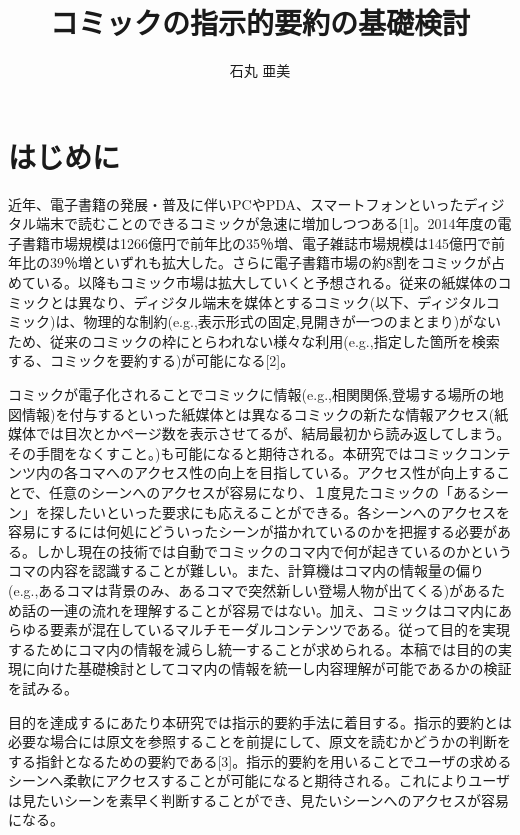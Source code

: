 \documentclass[a4j]{matsushita-zemi}
\title{コミックの指示的要約の基礎検討}
\author{石丸 亜美}
\begin{document}
\maketitle

\section{はじめに}
\label{background} 

近年、電子書籍の発展・普及に伴いPCやPDA、スマートフォンといったディジタル端末で読むことのできるコミックが急速に増加しつつある[1]。2014年度の電子書籍市場規模は1266億円で前年比の35％増、電子雑誌市場規模は145億円で前年比の39％増といずれも拡大した。さらに電子書籍市場の約8割をコミックが占めている。以降もコミック市場は拡大していくと予想される。従来の紙媒体のコミックとは異なり、ディジタル端末を媒体とするコミック(以下、ディジタルコミック)は、物理的な制約(e.g.,表示形式の固定,見開きが一つのまとまり)がないため、従来のコミックの枠にとらわれない様々な利用(e.g.,指定した箇所を検索する、コミックを要約する)が可能になる[2]。

コミックが電子化されることでコミックに情報(e.g.,相関関係,登場する場所の地図情報)を付与するといった紙媒体とは異なるコミックの新たな情報アクセス(紙媒体では目次とかページ数を表示させてるが、結局最初から読み返してしまう。その手間をなくすこと。)も可能になると期待される。本研究ではコミックコンテンツ内の各コマへのアクセス性の向上を目指している。アクセス性が向上することで、任意のシーンへのアクセスが容易になり、１度見たコミックの「あるシーン」を探したいといった要求にも応えることができる。各シーンへのアクセスを容易にするには何処にどういったシーンが描かれているのかを把握する必要がある。しかし現在の技術では自動でコミックのコマ内で何が起きているのかというコマの内容を認識することが難しい。また、計算機はコマ内の情報量の偏り(e.g.,あるコマは背景のみ、あるコマで突然新しい登場人物が出てくる)があるため話の一連の流れを理解することが容易ではない。加え、コミックはコマ内にあらゆる要素が混在しているマルチモーダルコンテンツである。従って目的を実現するためにコマ内の情報を減らし統一することが求められる。本稿では目的の実現に向けた基礎検討としてコマ内の情報を統一し内容理解が可能であるかの検証を試みる。

目的を達成するにあたり本研究では指示的要約手法に着目する。指示的要約とは必要な場合には原文を参照することを前提にして、原文を読むかどうかの判断をする指針となるための要約である[3]。指示的要約を用いることでユーザの求めるシーンへ柔軟にアクセスすることが可能になると期待される。これによりユーザは見たいシーンを素早く判断することができ、見たいシーンへのアクセスが容易になる。
\end{document}
